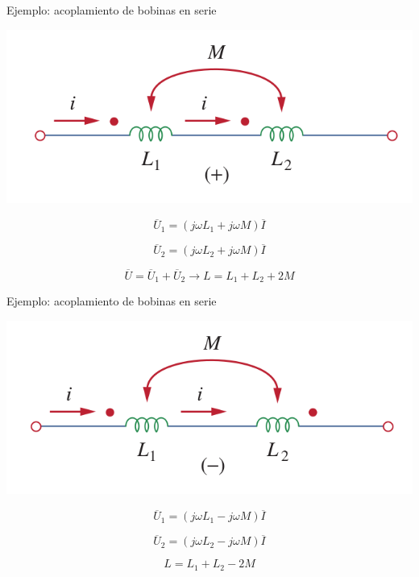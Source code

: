 \documentclass[xcolor={usenames,svgnames,dvipsnames}]{beamer}
\begin{document}
\begin{frame}[label={sec:org5ac560c}]{Ejemplo: acoplamiento de bobinas en serie}
\begin{center}
\includegraphics[width=.9\linewidth]{figs/bobinas_serie1.png}
\end{center}
\[
  \overline{U}_1 = (j \omega L_1 + j \omega M) \overline{I}
\]

\[
  \overline{U}_2 = (j \omega L_2 + j \omega M) \overline{I}
\]

\[
 \overline{U} = \overline{U}_1 + \overline{U}_2 \rightarrow \boxed{L = L_1 + L_2 + 2M}
\]
\end{frame}
\begin{frame}[label={sec:org0bda34d}]{Ejemplo: acoplamiento de bobinas en serie}
\begin{center}
\includegraphics[width=.9\linewidth]{figs/bobinas_serie2.png}
\end{center}
\[
  \overline{U}_1 = (j \omega L_1 - j \omega M) \overline{I}
\]

\[
  \overline{U}_2 = (j \omega L_2 - j \omega M) \overline{I}
\]

\[
 \boxed{L = L_1 + L_2 - 2M}
\]
\end{frame}
\end{document}
